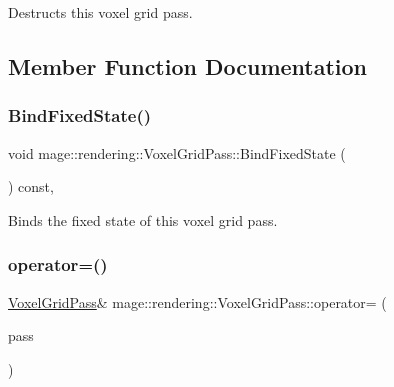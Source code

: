 Destructs this voxel grid pass. 

\subsection{Member Function Documentation}
\mbox{\label{classmage_1_1rendering_1_1_voxel_grid_pass_a38a3d6338eded537aab2ced5c486bdd4}} 
\subsubsection{\texorpdfstring{Bind\+Fixed\+State()}{BindFixedState()}}
{\footnotesize\ttfamily void mage\+::rendering\+::\+Voxel\+Grid\+Pass\+::\+Bind\+Fixed\+State (\begin{DoxyParamCaption}{ }\end{DoxyParamCaption}) const\hspace{0.3cm}{\ttfamily [private]}, {\ttfamily [noexcept]}}

Binds the fixed state of this voxel grid pass. \mbox{\label{classmage_1_1rendering_1_1_voxel_grid_pass_a6f696f05c430a0b84d8346099ec7d0aa}} 
\subsubsection{\texorpdfstring{operator=()}{operator=()}\hspace{0.1cm}{\footnotesize\ttfamily [1/2]}}
{\footnotesize\ttfamily \mbox{\hyperlink{classmage_1_1rendering_1_1_voxel_grid_pass}{Voxel\+Grid\+Pass}}\& mage\+::rendering\+::\+Voxel\+Grid\+Pass\+::operator= (\begin{DoxyParamCaption}\item[{const \mbox{\hyperlink{classmage_1_1rendering_1_1_voxel_grid_pass}{Voxel\+Grid\+Pass}} \&}]{pass }\end{DoxyParamCaption})\hspace{0.3cm}{\ttfamily [delete]}}

